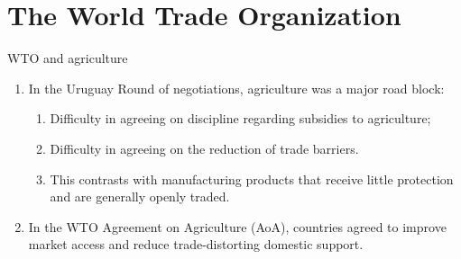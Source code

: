 \documentclass[table,xcolor=pdftex,dvipsnames]{beamer}\usepackage[]{graphicx}\usepackage[]{color}
\begin{document}
\section{The World Trade Organization}

\begin{frame}{WTO and agriculture}
\begin{enumerate}[label=\textbullet]
    \item In the Uruguay Round of negotiations, agriculture was a major road block:
      \begin{enumerate}[label=-]
        \item Difficulty in agreeing on discipline regarding subsidies to agriculture;
        \item Difficulty in agreeing on the reduction of trade barriers.
        \item This contrasts with manufacturing products that receive little protection and are generally openly traded.
      \end{enumerate}
    \item In the WTO Agreement on Agriculture (AoA), countries agreed to improve market access and reduce trade-distorting domestic support.
\end{enumerate}
\end{frame}

\end{document}
